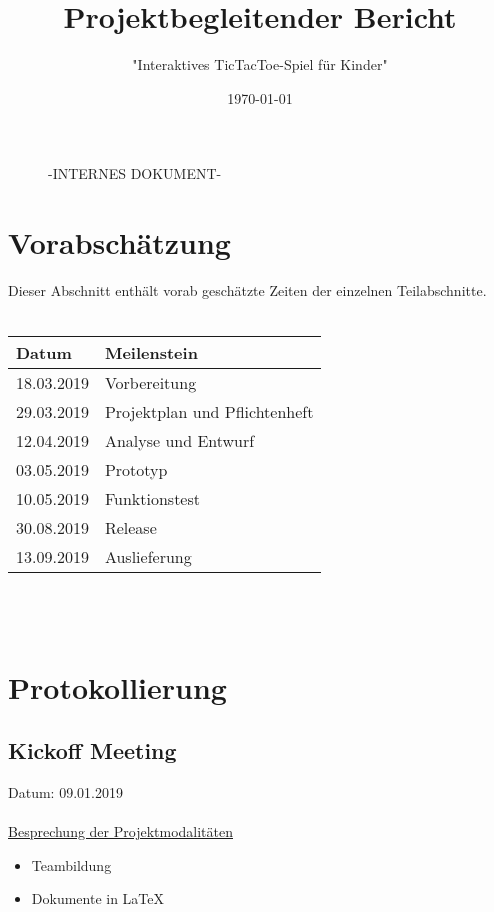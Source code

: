 \documentclass[12pt]{article}
\title{\textbf{Projektbegleitender Bericht}}
\author{"Interaktives TicTacToe-Spiel für Kinder"}
\date{\today} %
\begin{document}
\begin{titlepage}
	\centering	
	\begin{figure}
	\centering
	{\scshape\LARGE -INTERNES DOKUMENT- \par}
	\vspace{1cm}
	\end{figure}
	\maketitle
	\thispagestyle{empty}
	
	\vspace*{10cm}	
	

\end{titlepage}
	
\tableofcontents 
\newpage	

\setcounter{page}{3}

\section{Vorabschätzung}
Dieser Abschnitt enthält vorab geschätzte Zeiten der einzelnen Teilabschnitte.
\\\\
\begin{tabularx}{\textwidth}{|X|X|} \hline
\textbf{Datum}&\textbf{Meilenstein}\\ \hline
18.03.2019 & Vorbereitung\\ \hline
29.03.2019 & Projektplan und Pflichtenheft\\ \hline
12.04.2019 & Analyse und Entwurf\\ \hline
03.05.2019 & Prototyp\\ \hline
10.05.2019 & Funktionstest\\ \hline
30.08.2019 & Release\\ \hline
13.09.2019 & Auslieferung\\ \hline
\end{tabularx}\\\\

\newpage

\section{Protokollierung}

\subsection{Kickoff Meeting}
Datum: 09.01.2019 \\ \\
\uline{Besprechung der Projektmodalitäten}
\begin{itemize}\itemsep0em
\item Teambildung
\item Dokumente in LaTeX\\
\end{itemize}
\end{document}
